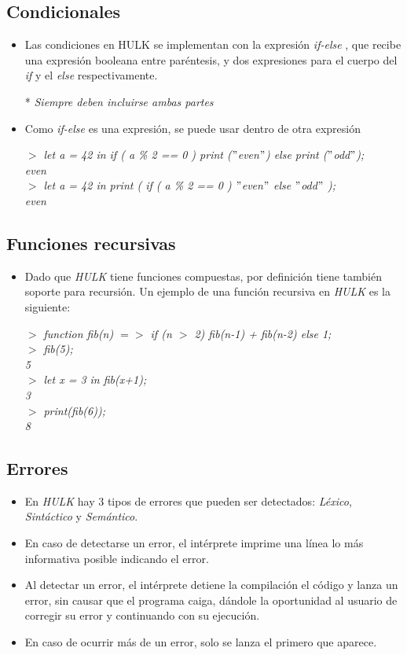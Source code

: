\documentclass[12pt]{article}
\newcommand{\hulk}{\emph{HULK} }
\newcommand{\ini}{$>$ }
\newcommand{\ifelse}{\textit{if-else} }
\begin{document}
\subsection*{Condicionales}
\begin{itemize}
	\item Las condiciones en HULK se implementan con la expresión \ifelse , que recibe una expresión booleana entre paréntesis, y dos expresiones para el cuerpo del \textit{if} y el \textit{else} respectivamente.
	
	* \emph{Siempre deben incluirse ambas partes}
	\item Como \ifelse es una expresión, se puede usar dentro de otra expresión
	
	\emph{
	\ini let a = 42 in if ( a \% 2 == 0 ) print ($"$even$"$) else print ($"$odd$"$); \\
	even \\
	\ini let a = 42 in print ( if ( a \% 2 == 0 ) $"$even$"$ else $"$odd$"$ ); \\
	even
	}
\end{itemize}

\subsection*{Funciones recursivas}
\begin{itemize}
	\item Dado que \hulk tiene funciones compuestas, por definición tiene también soporte para recursión.
	Un ejemplo de una función recursiva en \hulk es la siguiente:
	
	\emph{
	\ini function fib(n) $=>$ if (n $>$ 2) fib(n-1) + fib(n-2) else 1;	\\
	\ini fib(5); \\
	5 \\
	\ini let x = 3 in fib(x+1); \\
	3 \\
	\ini print(fib(6)); \\
	8
	}
\end{itemize}

\subsection*{Errores}
\begin{itemize}
	\item En \hulk hay 3 tipos de errores que pueden ser detectados: \emph{Léxico}, \emph{Sintáctico} y \emph{Semántico}.
	\item En caso de detectarse un error, el intérprete imprime una línea lo más informativa posible indicando el error.
	\item Al detectar un error, el intérprete detiene la compilación el código y lanza un error, sin causar que el programa caiga, dándole la oportunidad al usuario de corregir su error y continuando con su ejecución.
	\item En caso de ocurrir más de un error, solo se lanza el primero que aparece.
\end{itemize}
\end{document}
